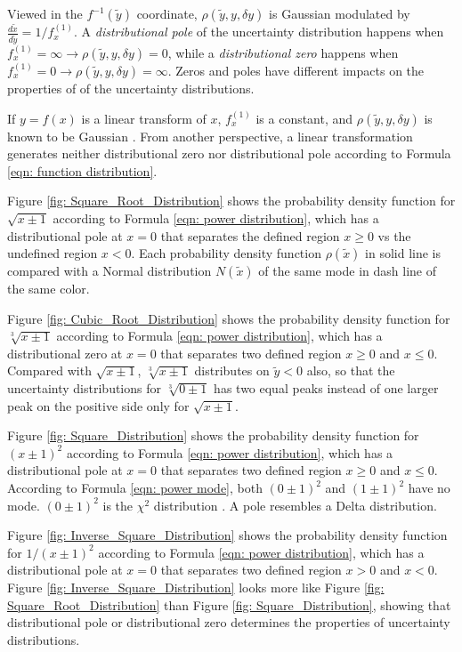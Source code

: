 \documentclass[twoside]{article}
\numberwithin{equation}{section}
\begin{document}
Viewed in the $f^{-1}(\tilde{y})$ coordinate, $\rho(\tilde{y}, y, \delta y)$ is Gaussian modulated by $\frac{d\tilde{x}}{d\tilde{y}} = 1/f^{(1)}_x$.
A \emph{distributional pole} of the uncertainty distribution happens when $f^{(1)}_x=\infty \rightarrow \rho(\tilde{y}, y, \delta y) = 0$, while a \emph{distributional zero} happens when $f^{(1)}_x=0 \rightarrow \rho(\tilde{y}, y, \delta y) = \infty$.
Zeros and poles have different impacts on the properties of of the uncertainty distributions.

If $y=f(x)$ is a linear transform of $x$, $f^{(1)}_x$ is a constant, and $\rho(\tilde{y}, y, \delta y)$ is known to be Gaussian \cite{Probability_Statistics}.
From another perspective, a linear transformation generates neither distributional zero nor distributional pole according to Formula \eqref{eqn: function distribution}.

Figure \ref{fig: Square_Root_Distribution} shows the probability density function for $\sqrt{x \pm 1}$ according to Formula \eqref{eqn: power distribution}, which has a distributional pole at $x=0$ that separates the defined region $x \ge 0$ vs the undefined region $x < 0$.
Each probability density function $\rho(\tilde{x})$ in solid line is compared with a Normal distribution $N(\tilde{x})$ of the same mode in dash line of the same color.

Figure \ref{fig: Cubic_Root_Distribution} shows the probability density function for $\sqrt[3]{x \pm 1}$ according to Formula \eqref{eqn: power distribution}, which has a distributional zero at $x=0$ that separates two defined region $x \ge 0$ and $x \leq 0$.
Compared with $\sqrt{x \pm 1}$, $\sqrt[3]{x \pm 1}$ distributes on $\tilde{y} < 0$ also, so that the uncertainty distributions for $\sqrt[3]{0 \pm 1}$ has two equal peaks instead of one larger peak on the positive side only for $\sqrt{x \pm 1}$.

Figure \ref{fig: Square_Distribution} shows the probability density function for $(x \pm 1)^2$ according to Formula \eqref{eqn: power distribution}, which has a distributional pole at $x=0$ that separates two defined region $x \ge 0$ and $x \leq 0$.
According to Formula \eqref{eqn: power mode}, both $(0 \pm 1)^2$ and $(1 \pm 1)^2$ have no mode.
$(0 \pm 1)^2$ is the $\chi^2$ distribution \cite{Statistical_Methods}.
A pole resembles a Delta distribution.

Figure \ref{fig: Inverse_Square_Distribution} shows the probability density function for $1/(x \pm 1)^2$ according to Formula \eqref{eqn: power distribution}, which has a distributional pole at $x=0$ that separates two defined region $x > 0$ and $x < 0$.
Figure \ref{fig: Inverse_Square_Distribution} looks more like Figure \ref{fig: Square_Root_Distribution} than Figure \ref{fig: Square_Distribution}, showing that distributional pole or distributional zero determines the properties of uncertainty distributions.
\end{document}
